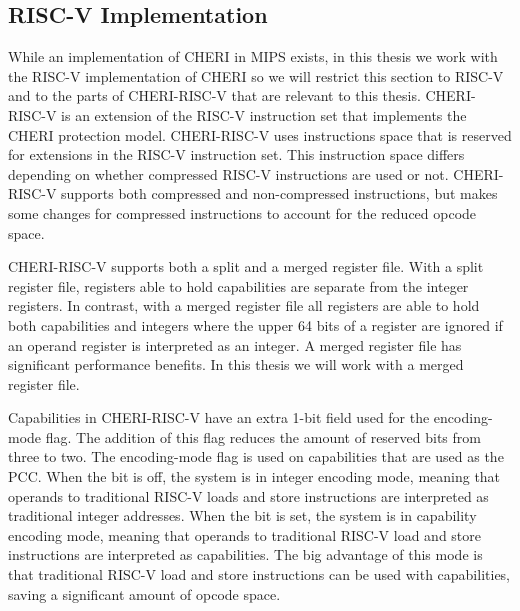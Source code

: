 \subsection{RISC-V Implementation}
\label{sec:cheri-risc-v}
While an implementation of CHERI in MIPS exists, in this thesis we work with the RISC-V implementation of CHERI so we will restrict this section to RISC-V and to the parts of CHERI-RISC-V that are relevant to this thesis. CHERI-RISC-V is an extension of the RISC-V instruction set that implements the CHERI protection model. CHERI-RISC-V uses instructions space that is reserved for extensions in the RISC-V instruction set. This instruction space differs depending on whether compressed RISC-V instructions are used or not. CHERI-RISC-V supports both compressed and non-compressed instructions, but makes some changes for compressed instructions to account for the reduced opcode space.

CHERI-RISC-V supports both a split and a merged register file. With a split register file, registers able to hold capabilities are separate from the integer registers. In contrast, with a merged register file all registers are able to hold both capabilities and integers where the upper 64 bits of a register are ignored if an operand register is interpreted as an integer. A merged register file has significant performance benefits. In this thesis we will work with a merged register file.

Capabilities in CHERI-RISC-V have an extra 1-bit field used for the encoding-mode flag. The addition of this flag reduces the amount of reserved bits from three to two. The encoding-mode flag is used on capabilities that are used as the PCC. When the bit is off, the system is in integer encoding mode, meaning that operands to traditional RISC-V loads and store instructions are interpreted as traditional integer addresses. When the bit is set, the system is in capability encoding mode, meaning that operands to traditional RISC-V load and store instructions are interpreted as capabilities. The big advantage of this mode is that traditional RISC-V load and store instructions can be used with capabilities, saving a significant amount of opcode space.

